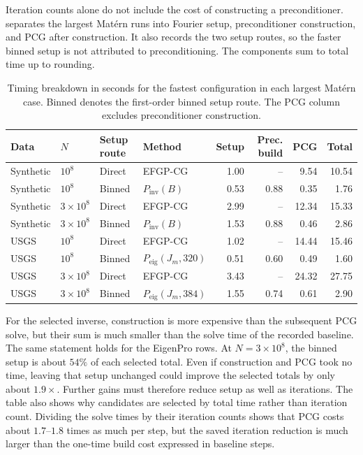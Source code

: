 Iteration counts alone do not include the cost of constructing a
preconditioner.  separates the largest Mat\'ern
runs into Fourier setup, preconditioner construction, and PCG after
construction. It also records the two setup routes, so the faster binned setup
is not attributed to preconditioning. The components sum to total time up to
rounding.

\begin{table}[t]
\centering
\footnotesize
\setlength{\tabcolsep}{3.5pt}
\caption{Timing breakdown in seconds for the fastest configuration in each
largest Mat\'ern case. Binned denotes the first-order binned setup route. The
PCG column excludes preconditioner construction.}
\label{tab:timing-breakdown}
\begin{tabular}{llllrrrr}
\toprule
Data & \(N\) & Setup route & Method & Setup & Prec. build & PCG & Total \\
\midrule
Synthetic & \(10^8\) & Direct & EFGP-CG & 1.00 & -- & 9.54 & 10.54 \\
Synthetic & \(10^8\) & Binned & \(P_{\mathrm{inv}}(B)\) & 0.53 & 0.88 & 0.35 & 1.76 \\
Synthetic & \(3{\times}10^8\) & Direct & EFGP-CG & 2.99 & -- & 12.34 & 15.33 \\
Synthetic & \(3{\times}10^8\) & Binned & \(P_{\mathrm{inv}}(B)\) & 1.53 & 0.88 & 0.46 & 2.86 \\
\addlinespace[1pt]
USGS & \(10^8\) & Direct & EFGP-CG & 1.02 & -- & 14.44 & 15.46 \\
USGS & \(10^8\) & Binned & \(P_{\mathrm{eig}}(J_m,320)\) & 0.51 & 0.60 & 0.49 & 1.60 \\
USGS & \(3{\times}10^8\) & Direct & EFGP-CG & 3.43 & -- & 24.32 & 27.75 \\
USGS & \(3{\times}10^8\) & Binned & \(P_{\mathrm{eig}}(J_m,384)\) & 1.55 & 0.74 & 0.61 & 2.90 \\
\bottomrule
\end{tabular}
\end{table}

For the selected inverse, construction is more expensive than the subsequent
PCG solve, but their sum is much smaller than the solve time of the recorded
baseline. The same statement holds for the EigenPro rows. At
\(N=3\times10^8\), the binned setup is about \(54\%\) of each selected
total. Even if construction and PCG took no time, leaving that setup unchanged
could improve the selected totals by only about \(1.9\times\). Further gains
must therefore reduce setup as well as iterations. The table also shows why
candidates are selected by total time rather than iteration count. Dividing
the solve times by their iteration counts shows that PCG costs about
\(1.7\)--\(1.8\) times as much per step, but the saved iteration reduction is
much larger than the one-time build cost expressed in baseline steps.

